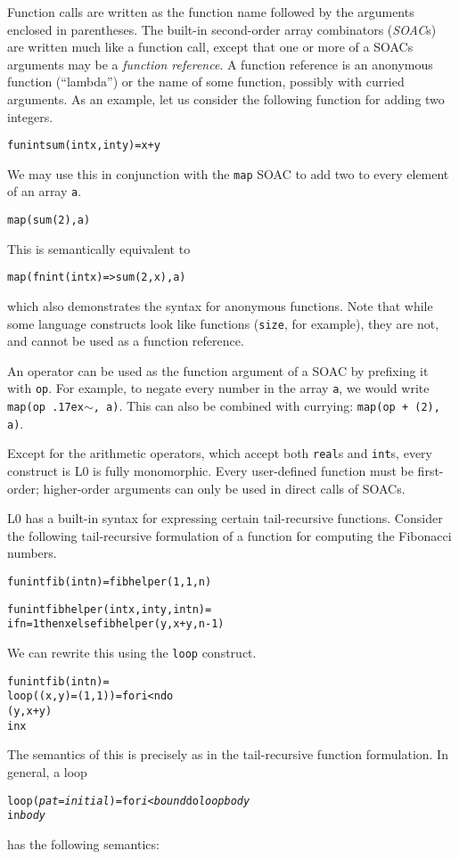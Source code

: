 \documentclass[oneside]{memoir}
\newcommand\realt[0]{\texttt{real}}
\newcommand\intt[0]{\texttt{int}}
\renewcommand\tilde[0]{{\raise.17ex\hbox{$\scriptstyle\sim$}}}
\begin{document}
Function calls are written as the function name followed by the
arguments enclosed in parentheses.  The built-in second-order array
combinators (\emph{SOAC}s) are written much like a function call,
except that one or more of a SOACs arguments may be a \emph{function
  reference}.  A function reference is an anonymous function
(``lambda'') or the name of some function, possibly with curried
arguments.  As an example, let us consider the following function for
adding two integers.
\begin{alltt}
fun int sum(int x, int y) = x + y
\end{alltt}
We may use this in conjunction with the \texttt{map} SOAC to add two
to every element of an array \texttt{a}.
\begin{alltt}
map(sum (2), a)
\end{alltt}
This is semantically equivalent to
\begin{alltt}
map(fn int (int x) => sum(2, x), a)
\end{alltt}
which also demonstrates the syntax for anonymous functions.  Note that
while some language constructs look like functions (\texttt{size}, for
example), they are not, and cannot be used as a function reference.

An operator can be used as the function argument of a SOAC by
prefixing it with \texttt{op}.  For example, to negate every number in
the array \texttt{a}, we would write \texttt{map(op \tilde{}, a)}.
This can also be combined with currying: \texttt{map(op + (2), a)}.

Except for the arithmetic operators, which accept both \realt{}s
and \intt{}s, every construct is L0 is fully monomorphic.  Every
user-defined function must be first-order; higher-order arguments can
only be used in direct calls of SOACs.

L0 has a built-in syntax for expressing certain tail-recursive
functions.  Consider the following tail-recursive formulation of a
function for computing the Fibonacci numbers.
\begin{alltt}
  fun int fib(int n) = fibhelper(1,1,n)

  fun int fibhelper(int x, int y, int n) =
    if n = 1 then x else fibhelper(y, x+y, n-1)
\end{alltt}
We can rewrite this using the \texttt{loop} construct.
\begin{alltt}
  fun int fib(int n) =
    loop ((x, y) = (1,1)) = for i < n do
                              (y, x+y)
    in x
\end{alltt}
The semantics of this is precisely as in the tail-recursive function
formulation.  In general, a loop
\begin{alltt}
  loop (\emph{pat} = \emph{initial}) = for \emph{i} < \emph{bound} do \emph{loopbody}
  in \emph{body}
\end{alltt}
has the following semantics:
\end{document}
